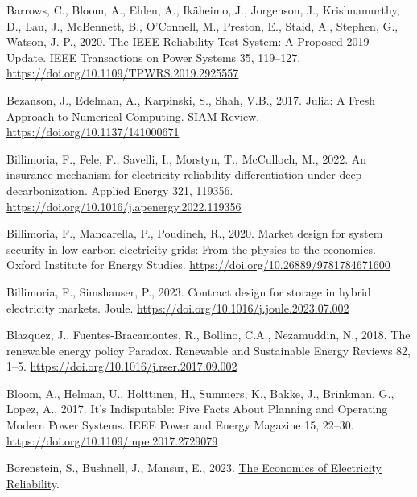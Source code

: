 \documentclass[12pt,a4paper,]{report}
\newlength{\cslhangindent}
\newenvironment{CSLReferences}[2] %
 {%
  \setlength{\parindent}{0pt}
  \ifodd #1 \everypar{\setlength{\hangindent}{\cslhangindent}}\ignorespaces\fi
  \ifnum #2 > 0
  \setlength{\parskip}{#2\baselineskip}
  \fi
 }%
 {}
\begin{document}
\begin{CSLReferences}{1}{0}
\leavevmode{}%
Barrows, C., Bloom, A., Ehlen, A., Ikäheimo, J., Jorgenson, J.,
Krishnamurthy, D., Lau, J., McBennett, B., O'Connell, M., Preston, E.,
Staid, A., Stephen, G., Watson, J.-P., 2020. The {IEEE Reliability Test
System}: {A Proposed} 2019 {Update}. IEEE Transactions on Power Systems
35, 119--127. \url{https://doi.org/10.1109/TPWRS.2019.2925557}

\leavevmode{}%
Bezanson, J., Edelman, A., Karpinski, S., Shah, V.B., 2017. Julia: {A
Fresh Approach} to {Numerical Computing}. SIAM Review.
\url{https://doi.org/10.1137/141000671}

\leavevmode{}%
Billimoria, F., Fele, F., Savelli, I., Morstyn, T., McCulloch, M., 2022.
An insurance mechanism for electricity reliability differentiation under
deep decarbonization. Applied Energy 321, 119356.
\url{https://doi.org/10.1016/j.apenergy.2022.119356}

\leavevmode{}%
Billimoria, F., Mancarella, P., Poudineh, R., 2020. Market design for
system security in low-carbon electricity grids: From the physics to the
economics. Oxford Institute for Energy Studies.
\url{https://doi.org/10.26889/9781784671600}

\leavevmode{}%
Billimoria, F., Simshauser, P., 2023. Contract design for storage in
hybrid electricity markets. Joule.
\url{https://doi.org/10.1016/j.joule.2023.07.002}

\leavevmode{}%
Blazquez, J., Fuentes-Bracamontes, R., Bollino, C.A., Nezamuddin, N.,
2018. The renewable energy policy {Paradox}. Renewable and Sustainable
Energy Reviews 82, 1--5.
\url{https://doi.org/10.1016/j.rser.2017.09.002}

\leavevmode{}%
Bloom, A., Helman, U., Holttinen, H., Summers, K., Bakke, J., Brinkman,
G., Lopez, A., 2017. It's {Indisputable}: {Five Facts About Planning}
and {Operating Modern Power Systems}. IEEE Power and Energy Magazine 15,
22--30. \url{https://doi.org/10.1109/mpe.2017.2729079}

\leavevmode{}%
Borenstein, S., Bushnell, J., Mansur, E., 2023.
\href{https://haas.berkeley.edu/wp-content/uploads/WP336.pdf}{The
{Economics} of {Electricity Reliability}}.


\end{CSLReferences}
\end{document}

